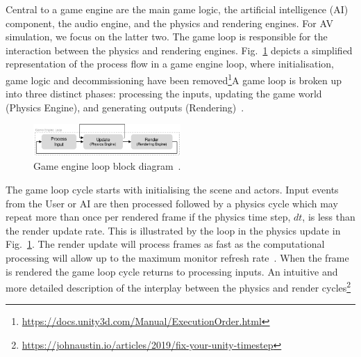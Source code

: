 Central to a game engine are the main game logic, the artificial intelligence (AI) component, the audio engine, and the physics and rendering engines. For AV simulation, we focus on the latter two. The game loop is responsible for the interaction between the physics and rendering engines. Fig.~\ref{GameEngineLoopDiagram} depicts a simplified representation of the process flow in a game engine loop, where  initialisation, game logic and decommissioning have been removed\DIFdelbegin {}\DIFdelend \DIFaddbegin \footnote{\url{https://docs.unity3d.com/Manual/ExecutionOrder.html}}\DIFaddend A game loop is broken up into three distinct phases: processing the inputs, updating the game world (Physics Engine), and generating outputs (Rendering)~\cite{GameEngineArchBook}.

\begin{figure}[h]
\centering
\includegraphics[width=0.5\textwidth]{../other/figures/GameEngineLoopv2.pdf}
\caption{Game engine loop block diagram~\cite{GameProgPatternsBook}.}
\label{GameEngineLoopDiagram}
\end{figure}

The game loop cycle starts with initialising the scene and actors. Input events from the User or AI are then processed followed by a physics cycle which may repeat more than once per rendered frame if the physics time step, $dt$, is less than the render update rate. This is illustrated by the loop in the physics update in Fig.~\ref{GameEngineLoopDiagram}. The render update will process frames as fast as the computational processing will allow up to the maximum monitor refresh rate~\cite{unity_framerates}. When the frame is rendered the game loop cycle returns to processing inputs. An intuitive and  more detailed description of the interplay between the physics and render cycles\DIFdelbegin {}\DIFdelend \DIFaddbegin {}\footnote{\url{https://johnaustin.io/articles/2019/fix-your-unity-timestep}}\DIFaddend 

